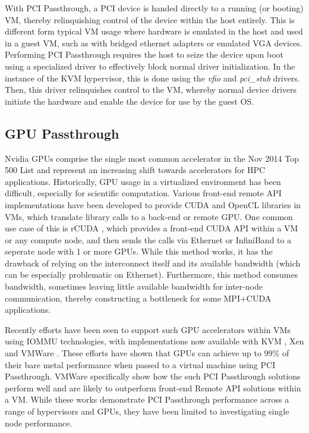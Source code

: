 \documentclass{sigplanconf}
\begin{document}
With PCI Passthrough, a PCI device is handed directly to a running (or booting) VM, thereby relinquishing control of the device within the host entirely. This is different form typical VM usage where hardware is emulated in the host and used in a guest VM, such as with bridged ethernet adapters or emulated VGA devices. Performing PCI Passthrough requires the host to seize the device upon boot using a specialized driver to effectively block normal driver initialization. In the instance of the KVM hypervisor, this is done using the \emph{vfio} and \emph{pci\_stub} drivers. Then, this driver relinquishes control to the VM, whereby normal device drivers initiate the hardware and enable the device for use by the guest OS.  

\subsection{GPU Passthrough}

Nvidia GPUs comprise the single most common accelerator in the Nov 2014 Top 500 List \cite{www-top500} and represent an increasing shift towards accelerators for HPC applications. Historically, GPU usage in a virtualized environment has been difficult, especially for scientific computation. Various front-end remote API implementations have been developed to provide CUDA and OpenCL libraries in VMs, which translate library calls to a back-end or remote GPU. One common use case of this is rCUDA \cite{duato2011enabling}, which provides a front-end CUDA API within a VM or any compute node, and then sends the calls via Ethernet or InfiniBand to a seperate node with 1 or more GPUs. While this method works, it has the drawback of relying on the interconnect itself and its available bandwidth (which can be especially problematic on Ethernet). Furthermore, this method consumes bandwidth, sometimes leaving little available bandwidth for inter-node communication, thereby constructing a bottleneck for some MPI+CUDA applications.

Recently efforts have been seen to support such GPU accelerators within VMs using IOMMU technologies, with implementations now available with KVM \cite{Walters2014cloud}, Xen \cite{Younge2014hpgc} and VMWare \cite{Vu2014}.  These efforts have shown that GPUs can achieve up to 99\% of their bare metal performance when passed to a virtual machine using PCI Passthrough.  VMWare specifically show how the such PCI Passthrough solutions perform well and are likely to outperform front-end Remote API solutions within a VM\cite{Walters2014cloud}.  While these works demonstrate PCI Passthrough performance across a range of hypervisors and GPUs, they have been limited to investigating single node performance. 
\end{document}
